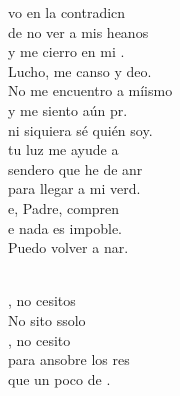 \documentclass[12pt]{article}
\begin{document}
\begin{multicols*}{2}
\begin{cancion}[Un poco de fe][Ixcís]
	vo en la contradicn\\
	de no ver a mis heanos\\
	y me cierro en mi .\\
	Lucho, me canso y deo.\\
	No me encuentro a míismo\\
	y me siento aún pr.\\
ni siquiera sé quién soy.\\
	tu luz me ayude a\\
	 sendero que he de anr\\
	para llegar a mi verd.\\
	e, Padre, compren\\
	e nada es impoble.\\
	Puedo volver a nar.\\\jump\\
	\begin{chorus}%
	, no cesitos\\
	No sito ssolo  \\
	, no cesito \\
	para ansobre los res\\
	que un poco de .\\
	\end{chorus}%
	\jump\\
\end{cancion}%


\end{multicols*}
\end{document}
